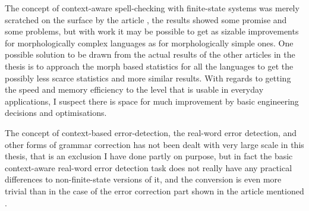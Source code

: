 \documentclass[officiallayout]{unihelcompling}
\begin{document}
The concept of context-aware spell-checking with finite-state systems was
merely scratched on the surface by the article \citep{pirinen2012improving},
the results showed some promise and some problems, but with work it may be
possible to get as sizable improvements for morphologically complex languages
as for morphologically simple ones. One possible solution to be drawn from
the actual results of the other articles in the thesis is to approach the
morph based statistics for all the languages to get the possibly less scarce
statistics and more similar results. With regards to getting the speed and
memory efficiency to the level that is usable in everyday applications, I
suspect there is space for much improvement by basic engineering decisions and
optimisations.

The concept of context-based error-detection, the real-word error detection,
and other forms of grammar correction has not been dealt with very large scale
in this thesis, that is an exclusion I have done partly on purpose, but in
fact the basic context-aware real-word error detection task does not really
have any practical differences to non-finite-state versions of it, and the
conversion is even more trivial than in the case of the error correction part
shown in the article mentioned \citep{pirinen2012improving}.



\end{document}
